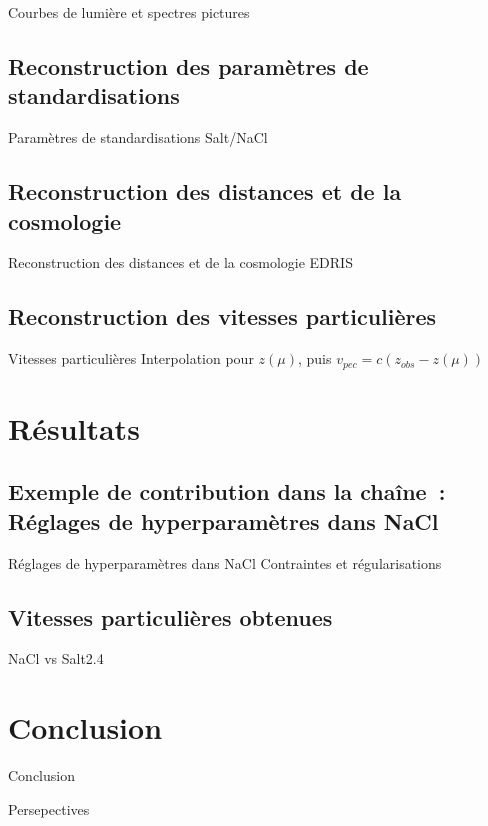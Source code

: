 \documentclass{beamer}
\begin{document}
\begin{frame}{Courbes de lumière et spectres}
	pictures
\end{frame}

\subsection{Reconstruction des paramètres de standardisations}

\begin{frame}{Paramètres de standardisations}
Salt/NaCl
\end{frame}

\subsection{Reconstruction des distances et de la cosmologie}

\begin{frame}{Reconstruction des distances et de la cosmologie}
EDRIS
\end{frame}

\subsection{Reconstruction des vitesses particulières}


\begin{frame}{Vitesses particulières}
Interpolation pour $z(\mu)$, puis $v_{pec} = c(z_{obs} - z(\mu))$
\end{frame}

\section{Résultats}

\subsection[Contribution dans \textsc{Lemaître}]{Exemple de contribution dans la chaîne~: Réglages de hyperparamètres dans NaCl}

\begin{frame}{Réglages de hyperparamètres dans NaCl}
Contraintes et régularisations
 
\end{frame}

\subsection{Vitesses particulières obtenues}

\begin{frame}{NaCl vs Salt2.4}

\end{frame}


\section{Conclusion}

\begin{frame}{Conclusion}

\end{frame}

\begin{frame}{Persepectives}

\end{frame}
\end{document}
